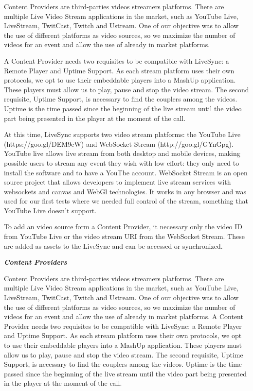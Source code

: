 Content Providers are third-parties videos streamers platforms. There are multiple Live Video Stream applications in the market, such as YouTube Live, LiveStream, TwitCast, Twitch and Ustream. One of our objective was to allow the use of different platforms as video sources, so we maximize the number of videos for an event and allow the use of already in market platforms. 

A Content Provider needs two requisites to be compatible with LiveSync: a Remote Player and Uptime Support. As each stream platform uses their own protocols, we opt to use their embeddable players into a MashUp application. These players must allow us to play, pause and stop the video stream. The second requisite, Uptime Support, is necessary to find the couplers among the videos. Uptime is the time passed since the beginning of the live stream until the video part being presented in the player at the moment of the call.

At this time, LiveSync supports two video stream platforms: the YouTube Live (https://goo.gl/DEM9eW) and WebSocket Stream (http://goo.gl/GYnGpg). YouTube live allows live stream from both desktop and mobile devices, making possible users to stream any event they wish with low effort: they only need to install the software and to have a YouTbe account. WebSocket Stream is an open source project that allows developers to implement live stream services with websockets and canvas and WebGl technologies. It works in any browser and was used for our first tests where we needed full control of the stream, something that YouTube Live doesn't support.

To add an video source form a Content Provider, it necessary only the video ID from YouTube Live or the video stream URI from the WebSocket Stream. These are added as assets to the LiveSync and can be accessed or synchronized.



\textbf{\textit{Content Providers}}

Content Providers are third-parties videos streamers platforms. There are multiple Live Video Stream applications in the market, such as YouTube Live, LiveStream, TwitCast, Twitch and Ustream. One of our objective was to allow the use of different platforms as video sources, so we maximize the number of videos for an event and allow the use of already in market platforms. A Content Provider needs two requisites to be compatible with LiveSync: a Remote Player and Uptime Support. As each stream platform uses their own protocols, we opt to use their embeddable players into a MashUp application. These players must allow us to play, pause and stop the video stream. The second requisite, Uptime Support, is necessary to find the couplers among the videos. Uptime is the time passed since the beginning of the live stream until the video part being presented in the player at the moment of the call.